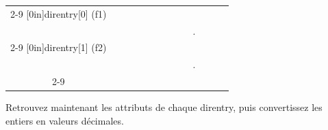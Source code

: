\documentclass[11pt,a4paper]{article}
\begin{document}
\begin{center}


\begin{tabular}{ c   | m{0.45cm} | m{0.45cm} | m{0.45cm} | m{0.45cm} | m{0.45cm} | m{0.45cm} | m{0.45cm} | m{0.45cm} | c | m{0.45cm} | m{0.45cm} | m{0.45cm} | }
\cline{2-9} \cline{11-13}
\multirow[c]{2}{*}[0in]{direntry[0] (f1)}  & & & & & & & & &     & & & \\
                                           & & & & & & & & &  .  & & & \\
\cline{2-9} \cline{11-13}
\multirow[c]{2}{*}[0in]{direntry[1] (f2)}  & & & & & & & & &     & & & \\
                                           & & & & & & & & &  .  & & & \\
\cline{2-9} \cline{11-13}
\end{tabular}

\end{center}

\medskip

Retrouvez maintenant les attributs de chaque direntry, puis convertissez les entiers en valeurs décimales.

\end{document}
